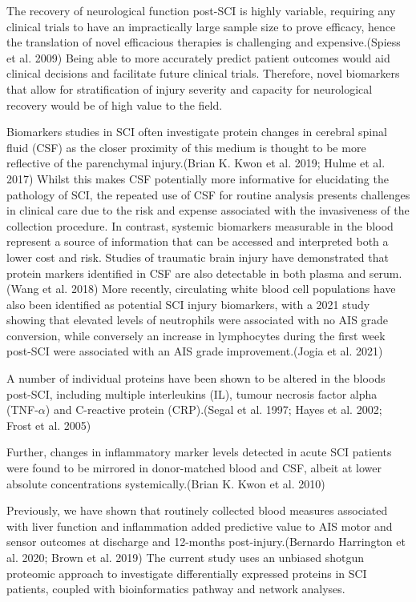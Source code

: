 \documentclass[9pt,lineno]{elife}
\begin{document}
The recovery of neurological function post-SCI is highly variable, requiring any clinical trials to have an impractically large sample size to prove efficacy, hence the translation of novel efficacious therapies is challenging and expensive.(Spiess et al. 2009) Being able to more accurately predict patient outcomes would aid clinical decisions and facilitate future clinical trials.
Therefore, novel biomarkers that allow for stratification of injury severity and capacity for neurological recovery would be of high value to the field.

Biomarkers studies in SCI often investigate protein changes in cerebral spinal fluid (CSF) as the closer proximity of this medium is thought to be more reflective of the parenchymal injury.(Brian K. Kwon et al. 2019; Hulme et al. 2017) Whilst this makes CSF potentially more informative for elucidating the pathology of SCI, the repeated use of CSF for routine analysis presents challenges in clinical care due to the risk and expense associated with the invasiveness of the collection procedure.
In contrast, systemic biomarkers measurable in the blood represent a source of information that can be accessed and interpreted both a lower cost and risk.
Studies of traumatic brain injury have demonstrated that protein markers identified in CSF are also detectable in both plasma and serum.(Wang et al. 2018) More recently, circulating white blood cell populations have also been identified as potential SCI injury biomarkers, with a 2021 study showing that elevated levels of neutrophils were associated with no AIS grade conversion, while conversely an increase in lymphocytes during the first week post-SCI were associated with an AIS grade improvement.(Jogia et al. 2021)

A number of individual proteins have been shown to be altered in the bloods post-SCI, including multiple interleukins (IL), tumour necrosis factor alpha (TNF-\(\alpha\)) and C-reactive protein (CRP).(Segal et al. 1997; Hayes et al. 2002; Frost et al. 2005)

Further, changes in inflammatory marker levels detected in acute SCI patients were found to be mirrored in donor-matched blood and CSF, albeit at lower absolute concentrations systemically.(Brian K. Kwon et al. 2010)

Previously, we have shown that routinely collected blood measures associated with liver function and inflammation added predictive value to AIS motor and sensor outcomes at discharge and 12-months post-injury.(Bernardo Harrington et al. 2020; Brown et al. 2019) The current study uses an unbiased shotgun proteomic approach to investigate differentially expressed proteins in SCI patients, coupled with bioinformatics pathway and network analyses.
\end{document}
